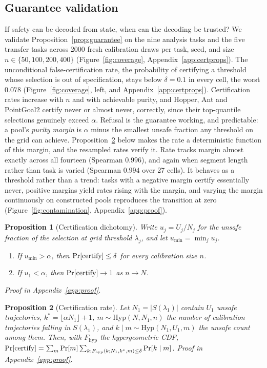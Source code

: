 \documentclass{article} %
\newtheorem{proposition}{Proposition}
\begin{document}
\subsection{Guarantee validation}
\label{sec:guarantee-validation}
If safety can be decoded from state, when can the decoding be trusted? We validate Proposition~\ref{prop:guarantee} on the nine analysis tasks and the five transfer tasks across 2000 fresh calibration draws per task, seed, and size $n \in \{50, 100, 200, 400\}$ (Figure~\ref{fig:coverage}, Appendix~\ref{app:certprops}). The unconditional false-certification rate, the probability of certifying a threshold whose selection is out of specification, stays below $\delta = 0.1$ in every cell, the worst $0.078$ (Figure~\ref{fig:coverage}, left, and Appendix~\ref{app:certprops}). Certification rates increase with $n$ and with achievable purity, and Hopper, Ant and PointGoal2 certify never or almost never, correctly, since their top-quantile selections genuinely exceed $\alpha$. Refusal is the guarantee working, and predictable: a pool's \emph{purity margin} is $\alpha$ minus the smallest unsafe fraction any threshold on the grid can achieve. Proposition~\ref{prop:rate} below makes the rate a deterministic function of this margin, and the resampled rates verify it. Rate tracks margin almost exactly across all fourteen (Spearman $0.996$), and again when segment length rather than task is varied (Spearman $0.994$ over 27 cells). It behaves as a threshold rather than a trend: tasks with a negative margin certify essentially never, positive margins yield rates rising with the margin, and varying the margin continuously on constructed pools reproduces the transition at zero (Figure~\ref{fig:contamination}, Appendix~\ref{app:proof}).

\begin{proposition}[Certification dichotomy]
\label{prop:dichotomy}
Write $u_j = U_j / N_j$ for the unsafe fraction of the selection at grid threshold $\lambda_j$, and let $u_{\min} = \min_j u_j$.
\begin{enumerate}
\item If $u_{\min} > \alpha$, then $\Pr[\textnormal{certify}] \le \delta$ for every calibration size $n$.
\item If $u_1 < \alpha$, then $\Pr[\textnormal{certify}] \to 1$ as $n \to N$.
\end{enumerate}
Proof in Appendix~\ref{app:proof}.
\end{proposition}

\begin{proposition}[Certification rate]
\label{prop:rate}
Let $N_1 = |S(\lambda_1)|$ contain $U_1$ unsafe trajectories, $k^{*} = \lfloor \alpha N_1 \rfloor + 1$, $m \sim \mathrm{Hyp}(N, N_1, n)$ the number of calibration trajectories falling in $S(\lambda_1)$, and $k \mid m \sim \mathrm{Hyp}(N_1, U_1, m)$ the unsafe count among them. Then, with $F_{\mathrm{hyp}}$ the hypergeometric CDF,
$\Pr[\textnormal{certify}] = \sum_{m} \Pr[m] \sum_{k : F_{\mathrm{hyp}}(k; N_1, k^{*}, m) \le \delta} \Pr[k \mid m]$.
Proof in Appendix~\ref{app:proof}.
\end{proposition}
\end{document}
